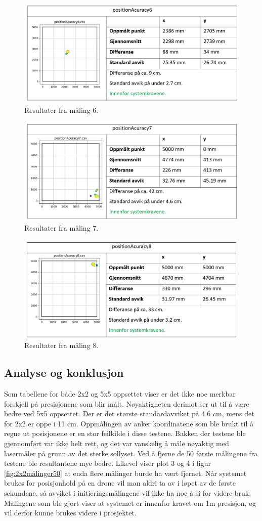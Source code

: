 \begin{figure}[htp]
\centering
\includegraphics[width=0.5\columnwidth]{figures/5x5-resultat6}
\caption{Resultater fra måling 6.}
\label{fig:5x5res6}
\end{figure}
\begin{figure}[htp]
\centering
\includegraphics[width=0.5\columnwidth]{figures/5x5-resultat7}
\caption{Resultater fra måling 7.}
\label{fig:5x5res3}
\end{figure}
\begin{figure}[htp]
\centering
\includegraphics[width=0.5\columnwidth]{figures/5x5-resultat8}
\caption{Resultater fra måling 8.}
\label{fig:5x5res4}
\end{figure}

\newpage
\subsection{Analyse og konklusjon}
Som tabellene for både 2x2 og 5x5 oppsettet viser er det ikke noe merkbar forskjell 
på presisjonene som blir målt. Nøyaktigheten derimot ser ut til å være bedre ved 5x5 oppsettet. 
Der er det største standardavviket på 4.6 cm, mens det for 2x2 er oppe i 11 cm. 
Oppmålingen av anker koordinatene som ble brukt til å regne ut posisjonene er en stor feilkilde i disse testene. 
Bakken der testene ble gjennomført var ikke helt rett, og det var vanskelig å måle nøyaktig med lasermåler på grunn av det sterke sollyset.
Ved å fjerne de 50 første målingene fra testene ble resultantene mye bedre. 
Likevel viser plot 3 og 4 i figur \ref{fig:2x2målinger50} at enda flere målinger burde ha vært fjernet. 
Når systemet brukes for posisjonhold på en drone vil man aldri ta av i løpet av de første sekundene, 
så avviket i initieringsmålingene vil ikke ha noe å si for videre bruk.
Målingene som ble gjort viser at systemet er innenfor kravet om 1m presisjon, og vil derfor kunne brukes videre i prosjektet. 

